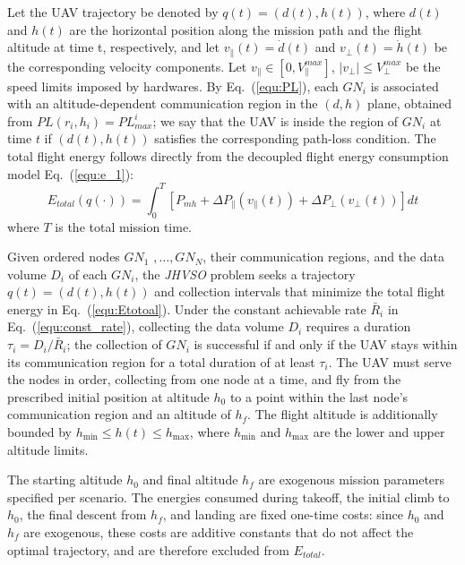 Let the UAV trajectory be denoted by $q(t) = (d(t), h(t))$, where $d(t)$ and $h(t)$ are the horizontal position along the mission path and the flight altitude at time t, respectively, and let $v_\parallel(t) = \dot{d}(t)$ and $v_\perp(t) = \dot{h}(t)$ be the corresponding velocity components.
Let $v_\parallel \in [0, V_{\parallel}^{max}]$, $|v_\perp| \leq V_{\perp}^{max}$ be the speed limits imposed by hardwares.
By Eq.~(\ref{equ:PL}), each $GN_i$ is associated with an altitude-dependent communication region in the $(d, h)$ plane, obtained from $PL(r_i, h_i) = PL_{max}^i$; we say that the UAV is inside the region of $GN_i$ at time $t$ if $(d(t), h(t))$ satisfies the corresponding path-loss condition.
The total flight energy follows directly from the decoupled flight energy consumption model Eq.~(\ref{equ:e_1}):
\begin{equation}
     E_{total}(q(\cdot)) = \int_0 ^T [P_{mh} + \Delta P_\parallel(v_\parallel(t)) + \Delta P_\perp(v_\perp(t))] dt 
\label{equ:Etotoal}
\end{equation}
where $T$ is the total mission time.

\begin{definition}\label{def:JHVSO}
    Given ordered nodes $GN_1$ $,\ldots,GN_N$, their communication regions, and the data volume $D_i$ of each $GN_i$, the \textit{JHVSO} problem seeks a trajectory $q(t)=(d(t),h(t))$ and collection intervals that minimize the total flight energy in Eq.~(\ref{equ:Etotoal}).
    Under the constant achievable rate $\bar{R}_i$ in Eq.~(\ref{equ:const_rate}), collecting the data volume $D_i$ requires a duration $\tau_i = D_i/\bar{R}_i$; the collection of $GN_i$ is successful if and only if the UAV stays within its communication region for a total duration of at least $\tau_i$.
    The UAV must serve the nodes in order, collecting from one node at a time, and fly from the prescribed initial position at altitude $h_0$ to a point within the last node's communication region and an altitude of $h_f$.
    The flight altitude is additionally bounded by $h_{\min} \le h(t) \le h_{\max}$, where $h_{\min}$ and $h_{\max}$ are the lower and upper altitude limits.
\end{definition}

The starting altitude $h_{0}$ and final altitude $h_f$ are exogenous mission parameters specified per scenario.
The energies consumed during takeoff, the initial climb to $h_0$, the final descent from $h_f$, and landing are fixed one-time costs: since $h_0$ and $h_f$ are exogenous, these costs are additive constants that do not affect the optimal trajectory, and are therefore excluded from $E_{total}$.
